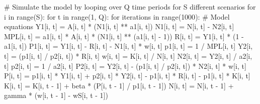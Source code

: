 \documentclass[
  letterpaper,
  DIV=11,
  numbers=noendperiod]{scrreprt}
\newenvironment{Shaded}{\begin{snugshade}}{\end{snugshade}}
\newcommand{\BuiltInTok}[1]{\textcolor[rgb]{0.00,0.23,0.31}{#1}}
\newcommand{\CommentTok}[1]{\textcolor[rgb]{0.37,0.37,0.37}{#1}}
\newcommand{\ControlFlowTok}[1]{\textcolor[rgb]{0.00,0.23,0.31}{#1}}
\newcommand{\DecValTok}[1]{\textcolor[rgb]{0.68,0.00,0.00}{#1}}
\newcommand{\KeywordTok}[1]{\textcolor[rgb]{0.00,0.23,0.31}{#1}}
\newcommand{\NormalTok}[1]{\textcolor[rgb]{0.00,0.23,0.31}{#1}}
\newcommand{\OperatorTok}[1]{\textcolor[rgb]{0.37,0.37,0.37}{#1}}
\begin{document}
\begin{tcolorbox}
\begin{Shaded}
\begin{Highlighting}[]
\CommentTok{\# Simulate the model by looping over Q time periods for S different scenarios}
\ControlFlowTok{for}\NormalTok{ i }\KeywordTok{in} \BuiltInTok{range}\NormalTok{(S):}
    \ControlFlowTok{for}\NormalTok{ t }\KeywordTok{in} \BuiltInTok{range}\NormalTok{(}\DecValTok{1}\NormalTok{, Q):}
        \ControlFlowTok{for}\NormalTok{ iterations }\KeywordTok{in} \BuiltInTok{range}\NormalTok{(}\DecValTok{1000}\NormalTok{):}
            \CommentTok{\# Model equations}
\NormalTok{            Y1[i, t] }\OperatorTok{=}\NormalTok{ A[i, t] }\OperatorTok{*}\NormalTok{ (N1[i, t] }\OperatorTok{**}\NormalTok{ a1[i, t])}
\NormalTok{            N1[i, t] }\OperatorTok{=}\NormalTok{ N[i, t] }\OperatorTok{{-}}\NormalTok{ N2[i, t]}
\NormalTok{            MPL[i, t] }\OperatorTok{=}\NormalTok{ a1[i, t] }\OperatorTok{*}\NormalTok{ A[i, t] }\OperatorTok{*}\NormalTok{ (N1[i, t] }\OperatorTok{**}\NormalTok{ (a1[i, t] }\OperatorTok{{-}} \DecValTok{1}\NormalTok{))}
\NormalTok{            R[i, t] }\OperatorTok{=}\NormalTok{ Y1[i, t] }\OperatorTok{*}\NormalTok{ (}\DecValTok{1} \OperatorTok{{-}}\NormalTok{ a1[i, t])}
\NormalTok{            P1[i, t] }\OperatorTok{=}\NormalTok{ Y1[i, t] }\OperatorTok{{-}}\NormalTok{ R[i, t] }\OperatorTok{{-}}\NormalTok{ N1[i, t] }\OperatorTok{*}\NormalTok{ w[i, t]}
\NormalTok{            p1[i, t] }\OperatorTok{=} \DecValTok{1} \OperatorTok{/}\NormalTok{ MPL[i, t]}
\NormalTok{            Y2[i, t] }\OperatorTok{=}\NormalTok{ (p1[i, t] }\OperatorTok{/}\NormalTok{ p2[i, t]) }\OperatorTok{*}\NormalTok{ R[i, t]}
\NormalTok{            w[i, t] }\OperatorTok{=}\NormalTok{ K[i, t] }\OperatorTok{/}\NormalTok{ N[i, t]}
\NormalTok{            N2[i, t] }\OperatorTok{=}\NormalTok{ Y2[i, t] }\OperatorTok{/}\NormalTok{ a2[i, t]}
\NormalTok{            p2[i, t] }\OperatorTok{=} \DecValTok{1} \OperatorTok{/}\NormalTok{ a2[i, t]}
\NormalTok{            P2[i, t] }\OperatorTok{=}\NormalTok{ Y2[i, t] }\OperatorTok{{-}}\NormalTok{ (p1[i, t] }\OperatorTok{/}\NormalTok{ p2[i, t]) }\OperatorTok{*}\NormalTok{ N2[i, t] }\OperatorTok{*}\NormalTok{ w[i, t]}
\NormalTok{            P[i, t] }\OperatorTok{=}\NormalTok{ p1[i, t] }\OperatorTok{*}\NormalTok{ Y1[i, t] }\OperatorTok{+}\NormalTok{ p2[i, t] }\OperatorTok{*}\NormalTok{ Y2[i, t] }\OperatorTok{{-}}\NormalTok{ p1[i, t] }\OperatorTok{*}\NormalTok{ R[i, t] }\OperatorTok{{-}}\NormalTok{ p1[i, t] }\OperatorTok{*}\NormalTok{ K[i, t]}
\NormalTok{            K[i, t] }\OperatorTok{=}\NormalTok{ K[i, t }\OperatorTok{{-}} \DecValTok{1}\NormalTok{] }\OperatorTok{+}\NormalTok{ beta }\OperatorTok{*}\NormalTok{ (P[i, t }\OperatorTok{{-}} \DecValTok{1}\NormalTok{] }\OperatorTok{/}\NormalTok{ p1[i, t }\OperatorTok{{-}} \DecValTok{1}\NormalTok{])}
\NormalTok{            N[i, t] }\OperatorTok{=}\NormalTok{ N[i, t }\OperatorTok{{-}} \DecValTok{1}\NormalTok{] }\OperatorTok{+}\NormalTok{ gamma }\OperatorTok{*}\NormalTok{ (w[i, t }\OperatorTok{{-}} \DecValTok{1}\NormalTok{] }\OperatorTok{{-}}\NormalTok{ wS[i, t }\OperatorTok{{-}} \DecValTok{1}\NormalTok{])}
\end{Highlighting}
\end{Shaded}

\end{tcolorbox}
\end{document}
